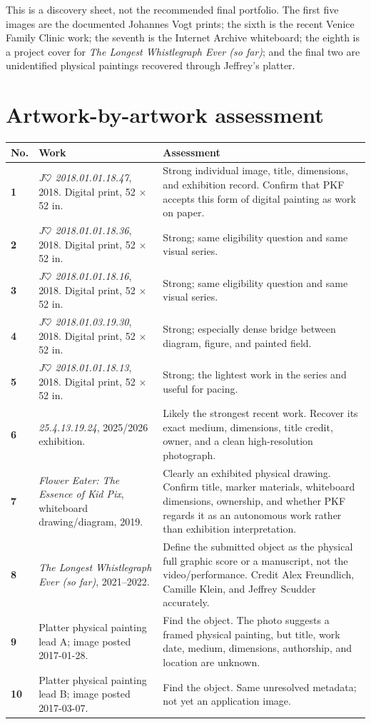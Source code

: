 \documentclass[11pt,letterpaper]{article}
\begin{document}
This is a discovery sheet, not the recommended final portfolio. The first five images are the documented Johannes Vogt prints; the sixth is the recent Venice Family Clinic work; the seventh is the Internet Archive whiteboard; the eighth is a project cover for \textit{The Longest Whistlegraph Ever (so far)}; and the final two are unidentified physical paintings recovered through Jeffrey's platter.

\clearpage
\section{Artwork-by-artwork assessment}

\small
\begin{tabularx}{\textwidth}{>{\bfseries}p{}p{}X}
\toprule
No. & Work & Assessment \\
\midrule
1 & \textit{J$\heartsuit$ 2018.01.01.18.47}, 2018. Digital print, 52 $\times$ 52 in. & Strong individual image, title, dimensions, and exhibition record. Confirm that PKF accepts this form of digital painting as work on paper. \\
2 & \textit{J$\heartsuit$ 2018.01.01.18.36}, 2018. Digital print, 52 $\times$ 52 in. & Strong; same eligibility question and same visual series. \\
3 & \textit{J$\heartsuit$ 2018.01.01.18.16}, 2018. Digital print, 52 $\times$ 52 in. & Strong; same eligibility question and same visual series. \\
4 & \textit{J$\heartsuit$ 2018.01.03.19.30}, 2018. Digital print, 52 $\times$ 52 in. & Strong; especially dense bridge between diagram, figure, and painted field. \\
5 & \textit{J$\heartsuit$ 2018.01.01.18.13}, 2018. Digital print, 52 $\times$ 52 in. & Strong; the lightest work in the series and useful for pacing. \\
6 & \textit{25.4.13.19.24}, 2025/2026 exhibition. & Likely the strongest recent work. Recover its exact medium, dimensions, title credit, owner, and a clean high-resolution photograph. \\
7 & \textit{Flower Eater: The Essence of Kid Pix}, whiteboard drawing/diagram, 2019. & Clearly an exhibited physical drawing. Confirm title, marker materials, whiteboard dimensions, ownership, and whether PKF regards it as an autonomous work rather than exhibition interpretation. \\
8 & \textit{The Longest Whistlegraph Ever (so far)}, 2021--2022. & Define the submitted object as the physical full graphic score or a manuscript, not the video/performance. Credit Alex Freundlich, Camille Klein, and Jeffrey Scudder accurately. \\
9 & Platter physical painting lead A; image posted 2017-01-28. & Find the object. The photo suggests a framed physical painting, but title, work date, medium, dimensions, authorship, and location are unknown. \\
10 & Platter physical painting lead B; image posted 2017-03-07. & Find the object. Same unresolved metadata; not yet an application image. \\
\bottomrule
\end{tabularx}
\normalsize
\end{document}

